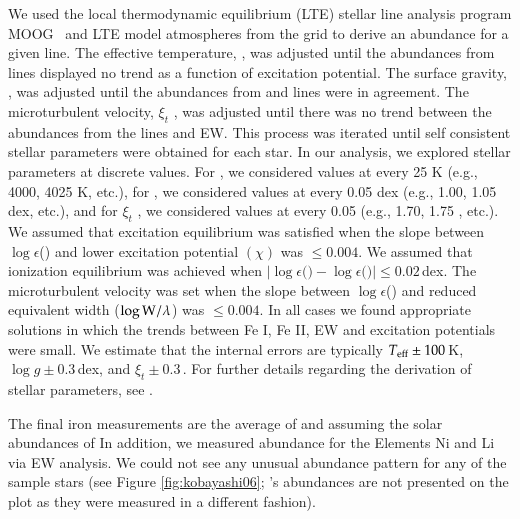 We used the local thermodynamic equilibrium (LTE) stellar line analysis program MOOG \citemoog\ and LTE model atmospheres from the \citet{2003IAUS..210P.A20C} grid to derive an abundance for a given line. The effective temperature, \teff, was adjusted until the abundances from  lines displayed no trend as a function of excitation potential. The surface gravity, \logg, was adjusted until the abundances from  and  lines were in agreement. The microturbulent velocity, $\xi _{t}$ , was adjusted until there was no trend between the abundances from the  lines and EW. This process was iterated until self consistent stellar parameters were obtained  for each star. In our analysis, we explored stellar parameters at discrete values. For \teff, we considered values at every 25 K (e.g., 4000, 4025 K, etc.), for \logg , we considered values at every 0.05 dex (e.g., 1.00, 1.05 dex, etc.), and for $\xi _{t}$ , we considered values at every 0.05 \kms (e.g., 1.70, 1.75 \kms, etc.). We assumed that excitation equilibrium was satisfied when the slope between $\log{\epsilon}$() and lower excitation potential $(\chi)$ was $\leq0.004$. We assumed that ionization equilibrium was achieved when $\vert\log{\epsilon} ($$) - \log{\epsilon} ($$)\vert \leq 0.02$\,dex. The microturbulent velocity was set when the slope between $\log{\epsilon}$() and reduced equivalent width ($\log{\rm{W}}/\lambda$) was $\leq0.004$. In all cases we found appropriate solutions in which the trends between Fe I, Fe II, EW and excitation potentials were small. We estimate that the internal errors are typically $T_{\rm{eff}}\pm100$\,K, $\log{g}\pm0.3$\,dex, and $\xi _{t}\pm0.3$\,\kms. 
For further details regarding the derivation of stellar parameters, see \citet{2008ApJ...673..854Y}.

The final iron measurements are the average of  and  assuming the solar abundances of \citet{2009ARA&A..47..481A} 
In addition, we measured abundance for the Elements Ni and Li via EW analysis. We could not see any unusual abundance pattern for any of the sample stars (see Figure \ref{fig:kobayashi06}; \starb's abundances are not presented on the plot as they were measured in a different fashion).  



